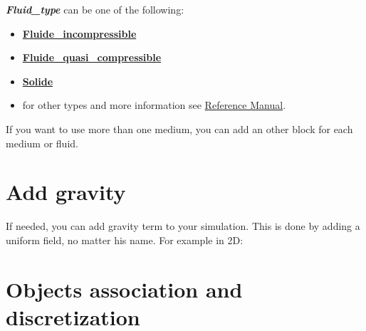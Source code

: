 {\bf{\textit{Fluid\_type}}} can be one of the following:
\begin{itemize}
\item \href{TRUST_Reference_Manual.pdf\#fluideincompressible}{\textbf{Fluide\_incompressible}}
\item \href{TRUST_Reference_Manual.pdf\#fluidequasicompressible}{\textbf{Fluide\_quasi\_compressible}}
\item \href{TRUST_Reference_Manual.pdf\#solide}{\textbf{Solide}}
\item for other types and more information see \href{TRUST_Reference_Manual.pdf\#milieubase}{\trust Reference Manual}.
\end{itemize}

If you want to use more than one medium, you can add an other block for each medium or fluid.\\





\section{Add gravity}
If needed, you can add gravity term to your simulation. This is done by adding
a uniform field, no matter his name. For example in 2D:

    \begin{center}
    \end{center}




\section{Objects association and discretization}
